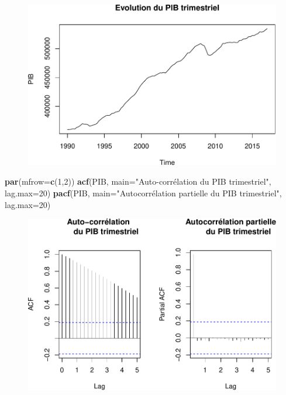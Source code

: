 \documentclass[11pt,]{article}
\newenvironment{Shaded}{\begin{snugshade}}{\end{snugshade}}
\newcommand{\KeywordTok}[1]{\textcolor[rgb]{0.13,0.29,0.53}{\textbf{{#1}}}}
\newcommand{\DataTypeTok}[1]{\textcolor[rgb]{0.13,0.29,0.53}{{#1}}}
\newcommand{\DecValTok}[1]{\textcolor[rgb]{0.00,0.00,0.81}{{#1}}}
\newcommand{\StringTok}[1]{\textcolor[rgb]{0.31,0.60,0.02}{{#1}}}
\newcommand{\NormalTok}[1]{{#1}}
\begin{document}
\begin{figure}[htbp]
\centering
\includegraphics{doc_files/figure-latex/unnamed-chunk-3-1.pdf}
\caption{\label{fig}}
\end{figure}

\begin{Shaded}
\begin{Highlighting}[]
  \KeywordTok{par}\NormalTok{(}\DataTypeTok{mfrow=}\KeywordTok{c}\NormalTok{(}\DecValTok{1}\NormalTok{,}\DecValTok{2}\NormalTok{))}
  \KeywordTok{acf}\NormalTok{(PIB, }\DataTypeTok{main=}\StringTok{"Auto-corrélation }
\StringTok{      du PIB trimestriel"}\NormalTok{, }\DataTypeTok{lag.max=}\DecValTok{20}\NormalTok{)}
  \KeywordTok{pacf}\NormalTok{(PIB, }\DataTypeTok{main=}\StringTok{"Autocorrélation partielle}
\StringTok{       du PIB trimestriel"}\NormalTok{, }\DataTypeTok{lag.max=}\DecValTok{20}\NormalTok{)}
\end{Highlighting}
\end{Shaded}

\begin{figure}[htbp]
\centering
\includegraphics{doc_files/figure-latex/unnamed-chunk-3-2.pdf}
\caption{\label{fig}}
\end{figure}
\end{document}

